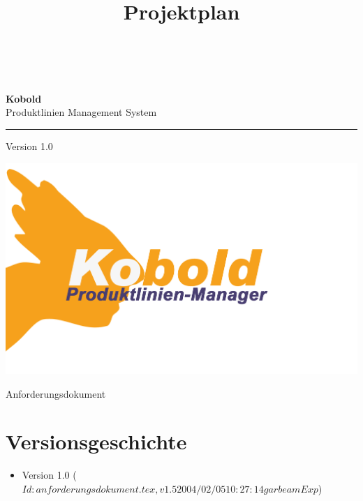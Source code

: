 \documentclass[a4paper,titlepage,12pt,ngerman]{scrbook}
\title {\huge \product\\[0.5cm]\large Projektplan \\[0.5cm] \version
  \\[1cm] \Large \company}
\newcommand\version{Version 1.0\xspace}
\begin{document}

\begin{titlepage}
\renewcommand{\thefootnote}{\fnsymbol{footnote}}
{\Huge
\raggedright
\textbf{\bf Kobold} \\
\huge Produktlinien Management System
\rule{\textwidth}{0.75pt}
\par
}
\begin{flushleft}
\normalsize
\version
\end{flushleft}

\vspace*{3cm}
\begin{center}
\includegraphics[width=15cm]{../common/logo-color.png}
\end{center}
\vfill

{\parindent=0cm
\Huge Anforderungsdokument
}


\setcounter{footnote}{0}
\end{titlepage}


\section*{Versionsgeschichte}

\begin{itemize}

\item Version 1.0  ($Id: anforderungsdokument.tex,v 1.5 2004/02/05 10:27:14 garbeam Exp $)


\end{itemize}


\tableofcontents




%
\end{document}
